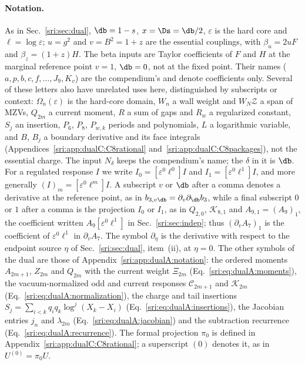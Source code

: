 \paragraph{Notation.} As in Sec.~\ref{sri:sec:dual}, $\db=1-s$, $x=\Ds=\db/2$, $\varepsilon$ is the hard core and
$\ell=\log\varepsilon$; $u=g^2$ and $v=B^2=1+z$ are the essential couplings, with $\beta_u=2uF$ and $\beta_z=(1+z)H$.
The beta inputs are Taylor coefficients of $F$ and $H$ at the marginal reference point $v=1$, $\db=0$, not at the
fixed point. Their names ($a,p,b,c,f,\dots,J_9,K_v$) are the compendium's and denote coefficients only. Several of these letters
also have unrelated uses here, distinguished by subscripts or context: $\Omega_n(\varepsilon)$ is the hard-core domain,
$W_n$ a wall weight and $W_N\mathcal Z$ a span of MZVs, $Q_{2m}$ a current moment, $R$ a sum of gaps and $R_w$ a
regularized constant, $S_j$ an insertion, $P_6$, $P_8$, $P_{w,k}$ periods and polynomials, $L$ a logarithmic
variable, and $B$, $B_j$ a boundary derivative and its face integrals (Appendices~\ref{sri:app:dualC:C8rational}
and~\ref{sri:app:dualC:C8packages}), not the essential charge. The input $N_\delta$ keeps the
compendium's name; the $\delta$ in it is $\db$. For a regulated response $I$ we write $I_0=[\varepsilon^0\ell^0]I$
and $I_1=[\varepsilon^0\ell^1]I$, and more generally $(I)_m=[\varepsilon^0\ell^m]I$. A subscript $v$ or $\db$ after a
comma denotes a derivative at the reference point, as in $b_{3,v\db}=\partial_v\partial_{\db}b_3$, while a final
subscript $0$ or $1$ after a comma is the projection $I_0$ or $I_1$, as in $Q_{2,0}$, $\mathcal K_{8,1}$ and
$A_{9,1}=(A_9)_1$, the coefficient written $A_9[\varepsilon^0\ell^1]$ in Sec.~\ref{sri:sec:indep}; thus $(\partial_vA_7)_1$
is the coefficient of $\varepsilon^0\ell^1$ in $\partial_vA_7$. The symbol $\partial_\eta$ is the derivative with respect to the
endpoint source $\eta$ of Sec.~\ref{sri:sec:dual}, item~(ii), at $\eta=0$. The other symbols of the dual are those of
Appendix~\ref{sri:app:dualA:notation}: the ordered moments $A_{2m+1}$, $Z_{2m}$ and $Q_{2m}$ with the current weight
$\Xi_{2m}$ (Eq.~\eqref{sri:eq:dualA:moments}), the vacuum-normalized odd and current
responses $\mathcal C_{2m+1}$ and $\mathcal K_{2m}$ (Eq.~\eqref{sri:eq:dualA:normalization}), the charge and tail
insertions $S_j=\sum_{i<k}q_iq_k\log^j(X_k-X_i)$ (Eq.~\eqref{sri:eq:dualA:insertions}), the Jacobian entries $j_n$ and
$\lambda_{2m}$ (Eq.~\eqref{sri:eq:dualA:jacobian}) and the subtraction recurrence (Eq.~\eqref{sri:eq:dualA:recurrence}).
The formal projection $\pi_0$ is defined in Appendix~\ref{sri:app:dualC:C8rational}; a superscript $(0)$ denotes it, as in
$U^{(0)}=\pi_0U$.

